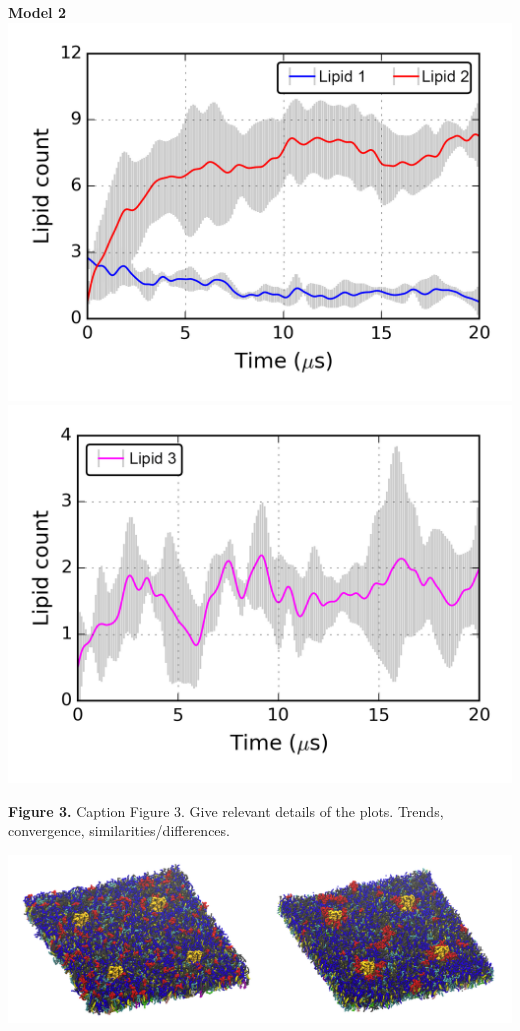 \documentclass[a0,final,landscape]{a0poster}
\begin{document}
\begin{minipage}[c][-30cm]{0.3\textwidth}
\Large\textcolor{vino}{\textbf{Model 2}}\\
\includegraphics[scale=1.7]{img/Model1_Lipid12.png}
\includegraphics[scale=1.7]{img/Model2_Lipid3.png}\\
\begin{center}
\small{\vspace{-1.5cm}\textbf{Figure 3.} Caption Figure 3. Give relevant details of the plots. Trends, convergence, similarities/differences.}
\end{center}
\vspace{0.5cm}
\hspace{1cm}
\includegraphics[scale=0.51]{img/snaps_white.png}\\

\end{minipage}
\end{document}
